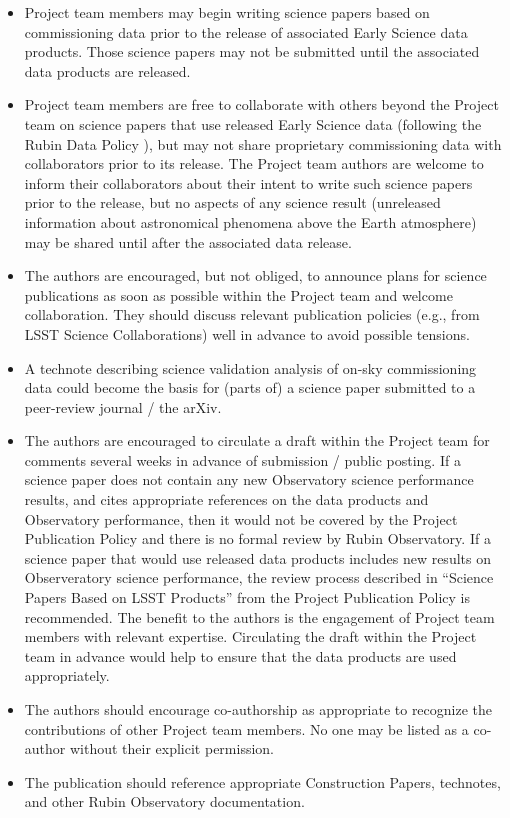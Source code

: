 \documentclass[SE,authoryear,toc]{lsstdoc}
\begin{document}
\begin{itemize}

  \item Project team members may begin writing science papers based on commissioning data prior to the release of associated Early Science data products.
  Those science papers may not be submitted until the associated data products are released.

  \item Project team members are free to collaborate with others beyond the Project team on science papers that use released Early Science data (following the Rubin Data Policy ), but may not share proprietary commissioning data with collaborators prior to its release.
  The Project team authors are welcome to inform their collaborators about their intent to write such science papers prior to the release, but no aspects of any science result (unreleased information about astronomical phenomena above the Earth atmosphere) may be shared until after the associated data release.

  \item The authors are encouraged, but not obliged, to announce plans for science publications as soon as possible within the Project team and welcome collaboration.
  They should discuss relevant publication policies (e.g., from LSST Science Collaborations) well in advance to avoid possible tensions.

  \item A technote describing science validation analysis of on-sky commissioning data could become the basis for (parts of) a science paper submitted to a peer-review journal / the arXiv.

  \item The authors are encouraged to circulate a draft within the Project team for comments several weeks in advance of submission / public posting.
  If a science paper does not contain any new Observatory science performance results, and cites appropriate references on the data products and Observatory performance, then it would not be covered by the Project Publication Policy and there is no formal review by Rubin Observatory.
  If a science paper that would use released data products includes new results on Observeratory science performance, the review process described in ``Science Papers Based on LSST Products'' from the Project Publication Policy  is recommended.
  The benefit to the authors is the engagement of Project team members with relevant expertise.
  Circulating the draft within the Project team in advance would help to ensure that the data products are used appropriately.

  \item The authors should encourage co-authorship as appropriate to recognize the contributions of other Project team members.
  No one may be listed as a co-author without their explicit permission.

  \item The publication should reference appropriate Construction Papers, technotes, and other Rubin Observatory documentation.

\end{itemize}
\end{document}
